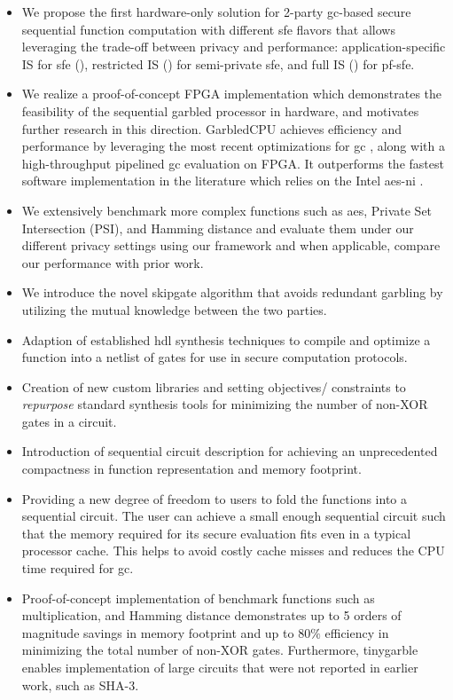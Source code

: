 \begin{itemize}
\item We propose the first hardware-only solution for 2-party \acrshort{gc}-based secure sequential function computation with different \acrshort{sfe} flavors that allows leveraging the trade-off between privacy and performance: application-specific IS for \acrshort{sfe} (), restricted IS () for semi-private \acrshort{sfe}, and full IS () for \acrshort{pf-sfe}.
\item We realize a proof-of-concept FPGA implementation which demonstrates the feasibility of the sequential garbled processor in hardware, and motivates further research in this direction. GarbledCPU achieves efficiency and performance by leveraging the most recent optimizations for \acrshort{gc} \cite{kolesnikov2008improved,bellare2013efficient,zahur2015two,songhori2015tinygarble}, along with a high-throughput pipelined \acrshort{gc} evaluation on FPGA. It outperforms the fastest software implementation in the literature which relies on the Intel \acrshort{aes-ni} \cite{bellare2013efficient}.
\item We extensively benchmark more complex functions such as \acrshort{aes}, Private Set Intersection (PSI), and Hamming distance and evaluate them under our different privacy settings using our framework and when applicable, compare our performance with prior work.
\item We introduce the novel \gls{skipgate} algorithm that avoids redundant garbling by utilizing the mutual knowledge between the two parties.
\item
  Adaption of established \acrshort{hdl} synthesis techniques to compile and optimize a function into a netlist of gates for use in secure computation protocols.
\item
  Creation of new custom libraries and setting objectives/ constraints to \emph{repurpose} standard synthesis tools for minimizing the number of non-XOR gates in a circuit.
\item
  Introduction of sequential circuit description for achieving an unprecedented compactness in function representation and memory footprint.
\item
  Providing a new degree of freedom to users to fold the functions into a sequential circuit.
  The user can achieve a small enough sequential circuit such that the memory required for its secure evaluation fits even in a typical processor cache.
  This helps to avoid costly cache misses and reduces the CPU time required for \acrshort{gc}.
\item
  Proof-of-concept implementation of benchmark functions such as multiplication, and Hamming distance demonstrates up to 5 orders of magnitude savings in memory footprint and up to $80\%$ efficiency in minimizing the total number of non-XOR gates.
  Furthermore, \gls{tinygarble} enables implementation of large circuits that were not reported in earlier work, such as SHA-3.%


\end{itemize}
